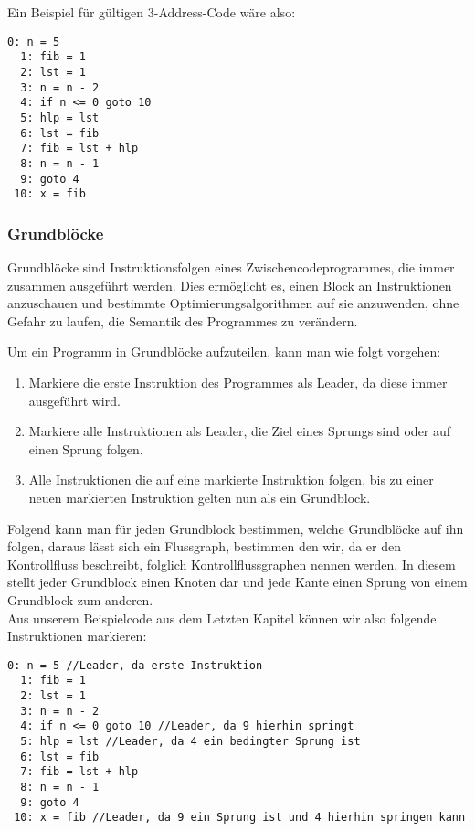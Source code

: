 Ein Beispiel für gültigen 3-Address-Code wäre also:
\begin{lstlisting}[caption={3-Address-Code, der die 5-te Fibonacci Zahl ausrechnet und in x speichert}]
  0: n = 5
  1: fib = 1  
  2: lst = 1
  3: n = n - 2
  4: if n <= 0 goto 10
  5: hlp = lst 
  6: lst = fib
  7: fib = lst + hlp
  8: n = n - 1
  9: goto 4
 10: x = fib
\end{lstlisting}


\subsubsection{Grundblöcke} \label{t:bb}
Grundblöcke sind Instruktionsfolgen eines Zwischencodeprogrammes,
die immer zusammen ausgeführt werden. \cite[S.619]{D}
Dies ermöglicht es, einen Block an Instruktionen anzuschauen 
und bestimmte Optimierungsalgorithmen auf sie anzuwenden, 
ohne Gefahr zu laufen, die Semantik des Programmes zu verändern.

\newpage
Um ein Programm in Grundblöcke aufzuteilen, kann man wie folgt vorgehen\cite[S.643]{D}:
\begin{enumerate}
  \item Markiere die erste Instruktion des Programmes als Leader, da diese immer ausgeführt wird.
  \item Markiere alle Instruktionen als Leader, die Ziel eines Sprungs sind oder auf einen Sprung folgen.
  \item Alle Instruktionen die auf eine markierte Instruktion folgen,
    bis zu einer neuen markierten Instruktion gelten nun als ein Grundblock.
\end{enumerate}

Folgend kann man für jeden Grundblock bestimmen, welche Grundblöcke auf ihn folgen, 
daraus lässt sich ein Flussgraph, bestimmen den wir, da er den Kontrollfluss beschreibt,
folglich Kontrollflussgraphen nennen werden. In diesem stellt jeder Grundblock einen Knoten dar
und jede Kante einen Sprung von einem Grundblock zum anderen.\\

Aus unserem Beispielcode aus dem Letzten Kapitel können wir also folgende Instruktionen markieren:
\begin{lstlisting}[caption=Fibonacci 3-Address-Code mit markierten Leadern]
  0: n = 5 //Leader, da erste Instruktion
  1: fib = 1  
  2: lst = 1
  3: n = n - 2
  4: if n <= 0 goto 10 //Leader, da 9 hierhin springt
  5: hlp = lst //Leader, da 4 ein bedingter Sprung ist
  6: lst = fib
  7: fib = lst + hlp
  8: n = n - 1
  9: goto 4
 10: x = fib //Leader, da 9 ein Sprung ist und 4 hierhin springen kann
\end{lstlisting}

